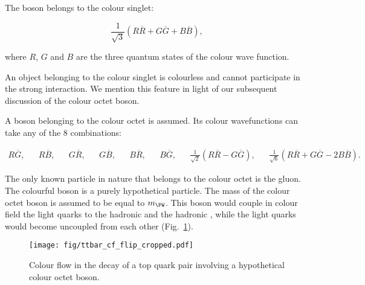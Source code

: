 The \PW boson belongs to the colour singlet:

\begin{equation}
\frac{1}{\sqrt{3}}\left(R\overline{R}+G\overline{G}+B\overline{B}\right),
\end{equation}

\noindent where $R$, $G$ and $B$ are the three quantum states of the colour wave function.

An object belonging to the colour singlet is colourless and cannot participate in the strong interaction. We mention this feature in light of our subsequent discussion of the colour octet \PW boson.


A \PW boson belonging to the colour octet is assumed. Its colour wavefunctions can take any of the 8 combinations:

\begin{align}
R\overline{G}, &&
R\overline{B}, &&
G\overline{R}, &&
G\overline{B}, &&
B\overline{R}, &&
B\overline{G}, &&
\frac{1}{\sqrt{2}}\left(R\overline{R}-G\overline{G}\right), &&
\frac{1}{\sqrt{6}}\left(R\overline{R}+G\overline{G}-2B\overline{B}\right).
\end{align}

The only known particle in nature that belongs to the colour octet is the gluon. The colourful \PW boson is a purely hypothetical particle. The mass of the colour octet \PW boson is assumed to be equal to $m_{\PW}$. This boson would couple in colour field the light quarks to the hadronic \cPqb and the hadronic \cPqt, while the light quarks would become uncoupled from each other (Fig.~\ref{fig:ttbar_cf_octet}).

  \begin{figure}[h!]
  \centering
  \texttt{[image: fig/ttbar\_cf\_flip\_cropped.pdf]}
  \caption{Colour flow in the decay of a top quark pair involving a hypothetical colour octet \PW boson.}
  \label{fig:ttbar_cf_octet}
\end{figure}

